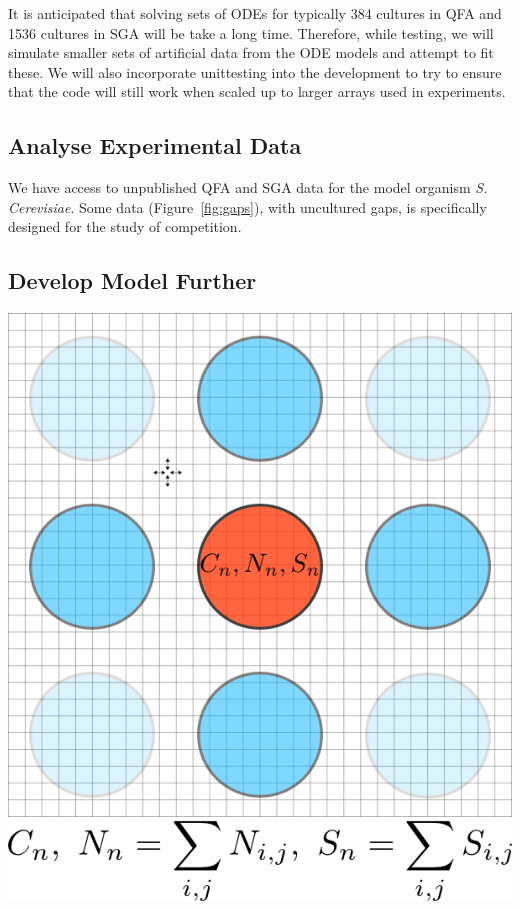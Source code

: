 It is anticipated that solving sets of ODEs for typically 384 cultures in QFA and 1536 cultures in SGA will be take a long time. Therefore, while testing, we will simulate smaller sets of artificial data from the ODE models and attempt to fit these. We will also incorporate unittesting into the development to try to ensure that the code will still work when scaled up to larger arrays used in experiments.

\subsection{Analyse Experimental Data}
\label{sec:analyse-data}
We have access to unpublished QFA and SGA data for the model organism \textit{S. Cerevisiae}. Some data (Figure~\ref{fig:gaps}), with uncultured gaps, is specifically designed for the study of competition.


\subsection{Develop Model Further}
\label{sec:dev-mod-further}

\begin{Figure}
  \centering
  \includegraphics[width=\linewidth]{square_array_grid}
\end{Figure}

